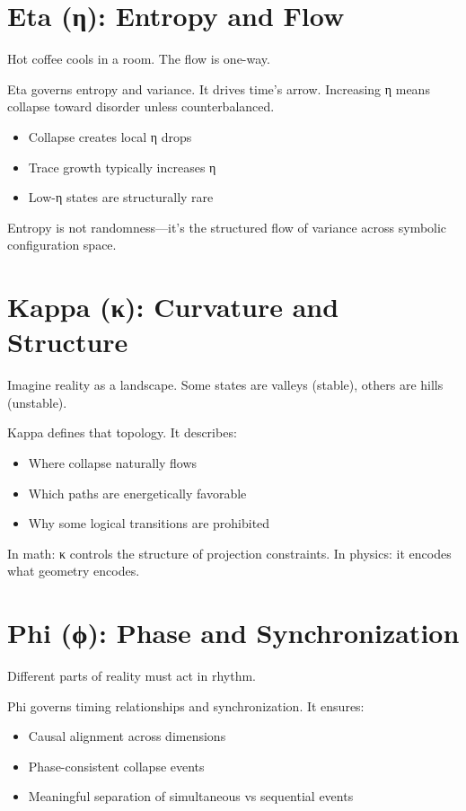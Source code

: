 \section{Eta (η): Entropy and Flow}

Hot coffee cools in a room. The flow is one-way.

Eta governs entropy and variance. It drives time’s arrow. Increasing η means collapse toward disorder unless counterbalanced.

\begin{itemize}
\item Collapse creates local η drops
\item Trace growth typically increases η
\item Low-η states are structurally rare
\end{itemize}

Entropy is not randomness—it’s the structured flow of variance across symbolic configuration space.

\section{Kappa (κ): Curvature and Structure}

Imagine reality as a landscape. Some states are valleys (stable), others are hills (unstable).

Kappa defines that topology. It describes:
\begin{itemize}
\item Where collapse naturally flows
\item Which paths are energetically favorable
\item Why some logical transitions are prohibited
\end{itemize}

In math: κ controls the structure of projection constraints. In physics: it encodes what geometry encodes.

\section{Phi (ϕ): Phase and Synchronization}

Different parts of reality must act in rhythm.

Phi governs timing relationships and synchronization. It ensures:
\begin{itemize}
\item Causal alignment across dimensions
\item Phase-consistent collapse events
\item Meaningful separation of simultaneous vs sequential events
\end{itemize}

